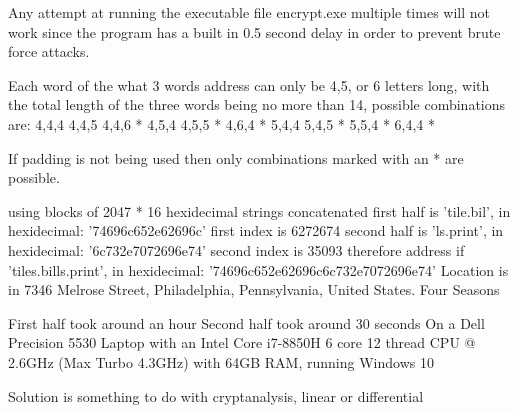 \documentclass[a4paper, 11pt]{article}
\begin{document}
Any attempt at running the executable file encrypt.exe multiple times will not work since the program has a built in 
0.5 second delay in order to prevent brute force attacks.

Each word of the what 3 words address can only be 4,5, or 6 letters long, with the total length of the three words being no more than 14, 
possible combinations are:
4,4,4
4,4,5
4,4,6 *
4,5,4
4,5,5 *
4,6,4 *
5,4,4
5,4,5 *
5,5,4 *
6,4,4 *

If padding is not being used then only combinations marked with an * are possible.

using blocks of 2047 * 16 hexidecimal strings concatenated
first half is 'tile.bil', in hexidecimal: '74696c652e62696c'
first index is 6272674
second half is 'ls.print', in hexidecimal: '6c732e7072696e74'
second index is 35093
therefore address if 'tiles.bills.print', in hexidecimal: '74696c652e62696c6c732e7072696e74'
Location is in 7346 Melrose Street, Philadelphia, Pennsylvania, United States.
Four Seasons 

First half took around an hour
Second half took around 30 seconds
On a Dell Precision 5530 Laptop with an Intel Core i7-8850H 6 core 12 thread CPU @ 2.6GHz (Max Turbo 4.3GHz) with 64GB RAM, running Windows 10


Solution is something to do with cryptanalysis, linear or differential
\end{document}

